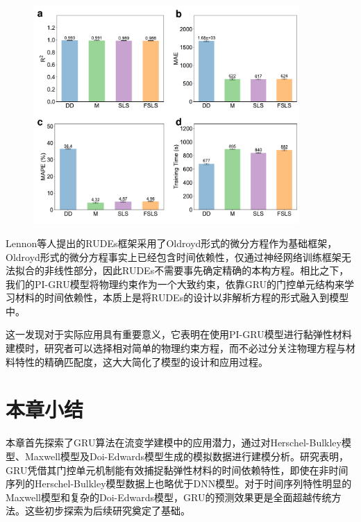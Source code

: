 \begin{figure}
  \centering
  \includegraphics[width=0.9\textwidth]{Fig/real-data-differcons-metrics.pdf}
\end{figure}
Lennon等人提出的RUDEs框架采用了Oldroyd形式的微分方程作为基础框架，Oldroyd形式的微分方程事实上已经包含时间依赖性，仅通过神经网络训练框架无法拟合的非线性部分，因此RUDEs不需要事先确定精确的本构方程\cite{lennonScientificMachineLearning2023a}。相比之下，我们的PI-GRU模型将物理约束作为一个大致约束，依靠GRU的门控单元结构来学习材料的时间依赖性，本质上是将RUDEs的设计以非解析方程的形式融入到模型中。

这一发现对于实际应用具有重要意义，它表明在使用PI-GRU模型进行黏弹性材料建模时，研究者可以选择相对简单的物理约束方程，而不必过分关注物理方程与材料特性的精确匹配度，这大大简化了模型的设计和应用过程。


\section{本章小结}

本章首先探索了GRU算法在流变学建模中的应用潜力，通过对Herschel-Bulkley模型、Maxwell模型及Doi-Edwards模型生成的模拟数据进行建模分析。研究表明，GRU凭借其门控单元机制能有效捕捉黏弹性材料的时间依赖特性，即使在非时间序列的Herschel-Bulkley模型数据上也略优于DNN模型。对于时间序列特性明显的Maxwell模型和复杂的Doi-Edwards模型，GRU的预测效果更是全面超越传统方法。这些初步探索为后续研究奠定了基础。


